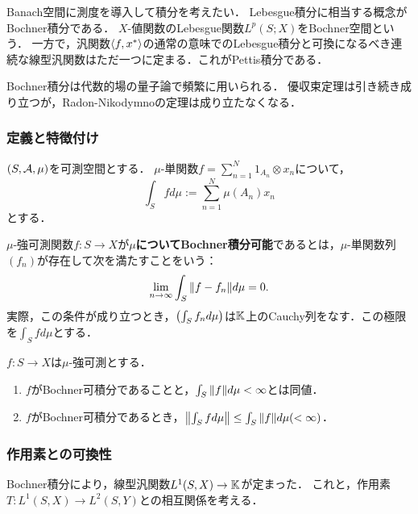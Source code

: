 \documentclass[uplatex,dvipdfmx]{jsreport}
\begin{document}
\begin{tcolorbox}[colframe=ForestGreen, colback=ForestGreen!10!white,breakable,colbacktitle=ForestGreen!40!white,coltitle=black,fonttitle=\bfseries\sffamily,
    title=]
    Banach空間に測度を導入して積分を考えたい．
    Lebesgue積分に相当する概念がBochner積分である．
    $X$-値関数のLebesgue関数$L^p(S;X)$をBochner空間という．
    一方で，汎関数$\langle f,x^*\rangle$の通常の意味でのLebesgue積分と可換になるべき連続な線型汎関数はただ一つに定まる．これがPettis積分である．

    Bochner積分は代数的場の量子論で頻繁に用いられる．
    優収束定理は引き続き成り立つが，Radon-Nikodymnoの定理は成り立たなくなる．
\end{tcolorbox}

\subsubsection{定義と特徴付け}

\begin{notation}
    $(S,\mathcal{A},\mu)$を可測空間とする．
    $\mu$-単関数$f=\sum^N_{n=1}1_{A_n}\otimes x_n$について，
    \[\int_Sfd\mu:=\sum^N_{n=1}\mu(A_n)x_n\]
    とする．
\end{notation}

\begin{definition}
    $\mu$-強可測関数$f:S\to X$が\textbf{$\mu$についてBochner積分可能}であるとは，$\mu$-単関数列$(f_n)$が存在して次を満たすことをいう：
    \[\lim_{n\to\infty}\int_S\|f-f_n\|d\mu=0.\]
    実際，この条件が成り立つとき，$\left(\int_Sf_nd\mu\right)$は$\mathbb{K}$上のCauchy列をなす．この極限を$\int_Sfd\mu$とする．
\end{definition}

\begin{lemma}
    $f:S\to X$は$\mu$-強可測とする．
    \begin{enumerate}
        \item $f$がBochner可積分であることと，$\int_S\|f\|d\mu<\infty$とは同値．
        \item $f$がBochner可積分であるとき，$\left\|\int_Sfd\mu\right\|\le\int_S\|f\|d\mu(<\infty)$．
    \end{enumerate}
\end{lemma}

\subsubsection{作用素との可換性}

\begin{tcolorbox}[colframe=ForestGreen, colback=ForestGreen!10!white,breakable,colbacktitle=ForestGreen!40!white,coltitle=black,fonttitle=\bfseries\sffamily,
title=]
    Bochner積分により，線型汎関数$L^1(S,X)\to\mathbb{K}$が定まった．
    これと，作用素$T:L^1(S,X)\to L^2(S,Y)$との相互関係を考える．
\end{tcolorbox}
\end{document}
